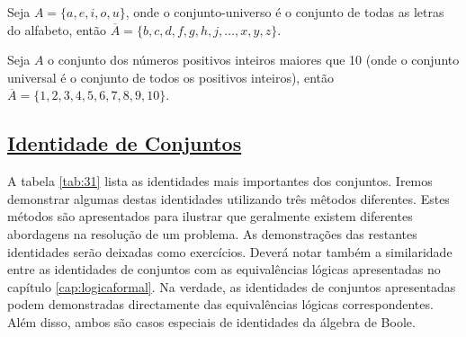 \begin{exmp}
\label{exem319}
Seja $A = \{a,e,i,o,u\}$, onde o conjunto-universo é o conjunto de todas as
letras do alfabeto, então $\overline{A} = \{b,c,d,f,g,h,j,\ldots,x,y,z\}$.
\end{exmp}

\begin{exmp}
\label{exem320}
Seja $A$ o conjunto dos números positivos inteiros maiores que 10 (onde o
conjunto universal é o conjunto de todos os positivos inteiros), então
$\overline{A} = \{1,2,3,4,5,6,7,8,9,10\}$.
\end{exmp}

\subsection*{\underline{Identidade de Conjuntos}}

A tabela \ref{tab:31} lista as identidades mais importantes dos conjuntos.
Iremos demonstrar algumas destas identidades utilizando três mêtodos diferentes.
Estes métodos são apresentados para ilustrar que geralmente existem diferentes
abordagens na resolução de um problema. As demonstrações das restantes
identidades serão deixadas como exercícios. Deverá notar também a similaridade
entre as identidades de conjuntos com as equivalências lógicas apresentadas no
capítulo \ref{cap:logicaformal}. Na verdade, as identidades de conjuntos
apresentadas podem demonstradas directamente das equivalências lógicas
correspondentes. Além disso, ambos são casos especiais de identidades da álgebra
de Boole.

